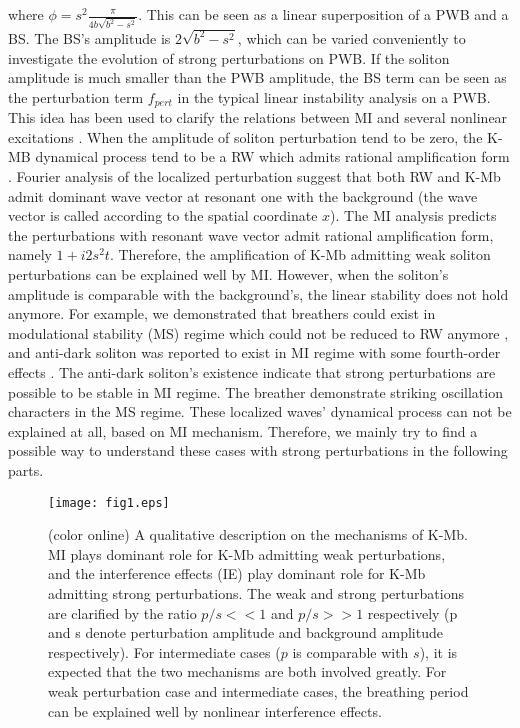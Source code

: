 \documentclass[aps,twocolumn,showpacs]{revtex4}
\begin{document}
where $\phi=s^2 \frac{\pi}{4 b \sqrt{b^2-s^2}}$. This can be seen as  a linear superposition of a PWB and a BS. The BS's amplitude is $2 \sqrt{b^2-s^2}$, which can be varied conveniently to investigate the evolution of strong perturbations on PWB. If the soliton amplitude is much smaller than the PWB amplitude, the BS term can be seen as the perturbation term $f_{pert}$ in the typical linear instability analysis on a PWB. This idea has been used to clarify the relations between MI and several nonlinear excitations \cite{zhaoling}. When the amplitude of soliton perturbation tend to be zero, the K-MB dynamical process tend to be a RW which admits rational amplification form \cite{Kibler,Dudley,Kibler2}.  Fourier analysis of the localized perturbation suggest that both RW and K-Mb admit dominant wave vector at resonant one with the background \cite{zhaoling,biondini2} (the wave vector is called according to the spatial coordinate $x$). The MI analysis predicts the perturbations with resonant wave vector admit rational amplification form, namely  $1 + i 2 s^2 t $.    Therefore, the amplification of K-Mb admitting weak soliton perturbations can be explained well by MI.   However, when the soliton's amplitude is comparable with the background's, the linear stability does not hold anymore. For example,  we demonstrated that breathers could exist in modulational stability (MS) regime which could not be reduced to RW anymore \cite{defnls}, and anti-dark soliton was reported to exist in MI regime with some fourth-order effects \cite{AD}. The anti-dark soliton's existence indicate that strong perturbations are possible to be stable in MI regime. The breather demonstrate striking oscillation characters in the MS regime. These localized waves' dynamical process can not be explained at all, based on MI mechanism. Therefore, we mainly try to find a possible way to understand these cases with strong perturbations in the following parts.

\begin{figure}[htb]
\centering
\label{fig:1}
{\texttt{[image: fig1.eps]}}
\caption{(color online) A qualitative description on the mechanisms of K-Mb. MI plays dominant role for K-Mb admitting weak perturbations, and the interference effects (IE) play dominant role for K-Mb admitting  strong perturbations. The weak and strong perturbations are clarified by the ratio $p/s<< 1$ and $p/s>>1$ respectively (p and s denote perturbation amplitude and background amplitude respectively). For intermediate cases ($p$ is comparable with $s$), it is expected that the two mechanisms  are both involved greatly. For weak perturbation case and intermediate cases, the breathing period can be explained well by nonlinear interference effects. }
\end{figure}
\end{document}

